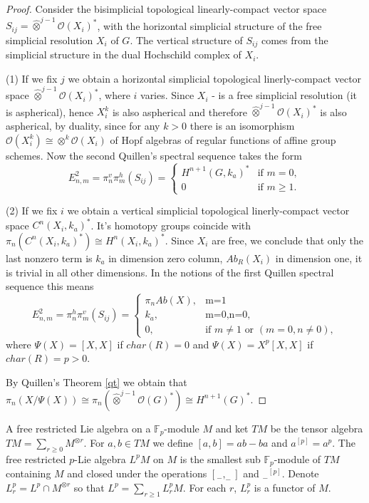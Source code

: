 \documentclass[11pt,a4paper]{article}
\begin{document}
\begin{proof}
Consider the bisimplicial topological linearly-compact vector space $S_{ij}=\widehat{\otimes}^{j-1} \mathcal{O}(X_i)^*$, 
with the horizontal simplicial structure of the free simplicial resolution $X_i$ of $G$.
The vertical structure of $S_{ij}$ comes from the simplicial structure in the dual Hochschild complex of $X_i$.

(1) If we fix $j$ we obtain a horizontal simplicial topological linerly-compact vector space $\widehat{\otimes}^{j-1} \mathcal{O}(X_i)^*$, where $i$ varies. 
Since $X_i$ - is a free simplicial resolution (it is aspherical), hence $X_i^k$ is also aspherical and therefore $\widehat{\otimes}^{j-1} \mathcal{O}(X_i)^*$ is also aspherical, by duality, since for any $k>0$ there is an isomorphism $\mathcal{O}(X_i^k)\cong \otimes^k \mathcal{O}(X_i)$ of Hopf algebras of regular functions of affine group schemes.
Now the second Quillen's spectral sequence takes the form
$$E_{n,m}^2 = \pi_n^v \pi_{m}^h (S_{ij}) =\begin{cases}
H^{n+1}(G,k_a)^*&\text{if $m=0$},\\
0&\text{if $m \ge 1$.}
\end{cases}
$$

(2) If we fix $i$ we obtain a vertical simplicial topological linerly-compact vector space $C^n(X_i,k_a)^*$.
It's homotopy groups coincide with $\pi_n(C^n(X_i,k_a)^*)\cong H^n(X_i,k_a)^*$. Since $X_i$ are free, we conclude that only the last nonzero term is $k_a$ in dimension zero column, $Ab_R(X_i)$ in dimension one, it is trivial in all other dimensions.
In the notions of the first Quillen spectral sequence this means 
$$E_{n,m}^2 = \pi_n^h \pi_m^v (S_{ij}) = \begin{cases}
\pi_n Ab(X),&\text{m=1}\\
k_a,&\text{m=0,n=0},\\
0, &\text{if $m \ne 1$ or $(m=0,n\ne 0)$},
\end{cases}
$$
where $\Psi(X)=[X,X]$ if $char(R)=0$ and $\Psi(X)=X^p[X,X]$ if $char(R)=p>0$.

By Quillen's Theorem \ref{qt} we obtain that $\pi_n(X/\Psi(X)) \cong \pi_{n}(\widehat{\otimes}^{j-1} \mathcal{O}(G)^*)\cong H^{n+1}(G)^*$.
\end{proof}
A free restricted Lie algebra on a $\mathbb{F}_p$-module $M$ and ket $TM$ be the tensor algebra $TM=\sum_{r\geq 0} M^{\otimes r}$.
For $a,b\in TM$ we define $[a,b]=ab-ba$ and $a^{[p]}=a^p$. The free restricted $p$-Lie algebra $L^p M$ on $M$ is the smallest sub $\mathbb{F}_p$-module of $TM$ containing $M$ and closed under the operations $[_{-},_{-}]$ and $_{-}{}^{[p]}$.
Denote $L^p_r=L^p\cap M^{\otimes r}$ so that $L^p=\sum_{r\geq 1} L^p_r M$.  For each $r$, $L^p_r$ is a functor of $M$.
\end{document}
